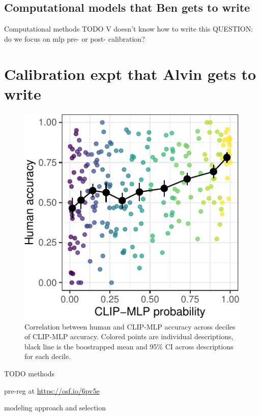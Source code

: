 \documentclass[10pt, letterpaper]{article}
\begin{document}
\subsection{Computational models that Ben gets to
write}\label{computational-models-that-ben-gets-to-write}

Computational methods TODO V doesn't know how to write this QUESTION: do
we focus on mlp pre- or post- calibration?

\section{Calibration expt that Alvin gets to
write}\label{calibration-expt-that-alvin-gets-to-write}

\begin{CodeChunk}
\begin{figure}[t]

{\centering \includegraphics[width=0.7\linewidth]{figs/fig-calibration-1} 

}

\caption[Correlation between human and CLIP-MLP accuracy across deciles of CLIP-MLP accuracy]{Correlation between human and CLIP-MLP accuracy across deciles of CLIP-MLP accuracy. Colored points are individual descriptions, black line is the boostrapped mean and 95\% CI across descriptions for each decile. \label{calibration}}\label{fig:fig-calibration}
\end{figure}
\end{CodeChunk}

TODO methods

pre-reg at \url{https://osf.io/6pv5e}

modeling approach and selection
\end{document}
